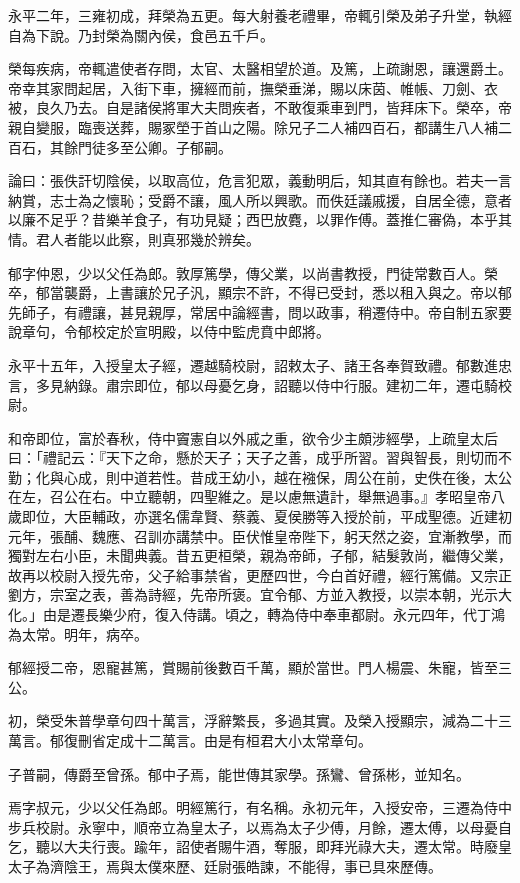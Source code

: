 \begin{pinyinscope}
永平二年，三雍初成，拜榮為五更。每大射養老禮畢，帝輒引榮及弟子升堂，執經自為下說。乃封榮為關內侯，食邑五千戶。

榮每疾病，帝輒遣使者存問，太官、太醫相望於道。及篤，上疏謝恩，讓還爵土。帝幸其家問起居，入街下車，擁經而前，撫榮垂涕，賜以床茵、帷帳、刀劍、衣被，良久乃去。自是諸侯將軍大夫問疾者，不敢復乘車到門，皆拜床下。榮卒，帝親自變服，臨喪送葬，賜冢塋于首山之陽。除兄子二人補四百石，都講生八人補二百石，其餘門徒多至公卿。子郁嗣。

論曰：張佚訐切陰侯，以取高位，危言犯眾，義動明后，知其直有餘也。若夫一言納賞，志士為之懷恥；受爵不讓，風人所以興歌。而佚廷議戚援，自居全德，意者以廉不足乎？昔樂羊食子，有功見疑；西巴放麑，以罪作傅。蓋推仁審偽，本乎其情。君人者能以此察，則真邪幾於辨矣。

郁字仲恩，少以父任為郎。敦厚篤學，傳父業，以尚書教授，門徒常數百人。榮卒，郁當襲爵，上書讓於兄子汎，顯宗不許，不得已受封，悉以租入與之。帝以郁先師子，有禮讓，甚見親厚，常居中論經書，問以政事，稍遷侍中。帝自制五家要說章句，令郁校定於宣明殿，以侍中監虎賁中郎將。

永平十五年，入授皇太子經，遷越騎校尉，詔敕太子、諸王各奉賀致禮。郁數進忠言，多見納錄。肅宗即位，郁以母憂乞身，詔聽以侍中行服。建初二年，遷屯騎校尉。

和帝即位，富於春秋，侍中竇憲自以外戚之重，欲令少主頗涉經學，上疏皇太后曰：「禮記云：『天下之命，懸於天子；天子之善，成乎所習。習與智長，則切而不勤；化與心成，則中道若性。昔成王幼小，越在襁保，周公在前，史佚在後，太公在左，召公在右。中立聽朝，四聖維之。是以慮無遺計，舉無過事。』孝昭皇帝八歲即位，大臣輔政，亦選名儒韋賢、蔡義、夏侯勝等入授於前，平成聖德。近建初元年，張酺、魏應、召訓亦講禁中。臣伏惟皇帝陛下，躬天然之姿，宜漸教學，而獨對左右小臣，未聞典義。昔五更桓榮，親為帝師，子郁，結髮敦尚，繼傳父業，故再以校尉入授先帝，父子給事禁省，更歷四世，今白首好禮，經行篤備。又宗正劉方，宗室之表，善為詩經，先帝所褒。宜令郁、方並入教授，以崇本朝，光示大化。」由是遷長樂少府，復入侍講。頃之，轉為侍中奉車都尉。永元四年，代丁鴻為太常。明年，病卒。

郁經授二帝，恩寵甚篤，賞賜前後數百千萬，顯於當世。門人楊震、朱寵，皆至三公。

初，榮受朱普學章句四十萬言，浮辭繁長，多過其實。及榮入授顯宗，減為二十三萬言。郁復刪省定成十二萬言。由是有桓君大小太常章句。

子普嗣，傳爵至曾孫。郁中子焉，能世傳其家學。孫鸞、曾孫彬，並知名。

焉字叔元，少以父任為郎。明經篤行，有名稱。永初元年，入授安帝，三遷為侍中步兵校尉。永寧中，順帝立為皇太子，以焉為太子少傅，月餘，遷太傅，以母憂自乞，聽以大夫行喪。踰年，詔使者賜牛酒，奪服，即拜光祿大夫，遷太常。時廢皇太子為濟陰王，焉與太僕來歷、廷尉張皓諫，不能得，事已具來歷傳。


\end{pinyinscope}
